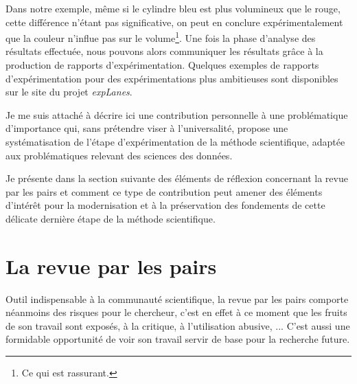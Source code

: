 
Dans notre exemple, même si le cylindre bleu est plus volumineux que le rouge, cette différence n'étant pas significative, on peut en conclure expérimentalement que la couleur n'influe pas sur le volume\footnote{Ce qui est rassurant.}. Une fois la phase d'analyse des résultats effectuée, nous pouvons alors communiquer les résultats grâce à la production de rapports d'expérimentation. Quelques exemples de rapports d'expérimentation pour des expérimentations plus ambitieuses sont disponibles sur le site du projet \textsl{expLanes}.

Je me suis attaché à décrire ici une contribution personnelle à une problématique d'importance qui, sans prétendre viser à l'universalité, propose une systématisation de l'étape d'expérimentation de la méthode scientifique, adaptée aux problématiques relevant des sciences des données.

Je présente dans la section suivante des éléments de réflexion concernant la revue par les pairs et comment ce type de contribution peut amener des éléments d'intérêt pour la modernisation et à la préservation des fondements de cette délicate dernière étape de la méthode scientifique.

\section{\nmu La revue par les pairs} \label{sec:pairs}

Outil indispensable à la communauté scientifique, la revue par les pairs comporte néanmoins des risques pour le chercheur, c'est en effet à ce moment que les fruits de son travail sont exposés, à la critique, à l'utilisation abusive, ... C'est aussi une formidable opportunité de voir son travail servir de base pour la recherche future.


